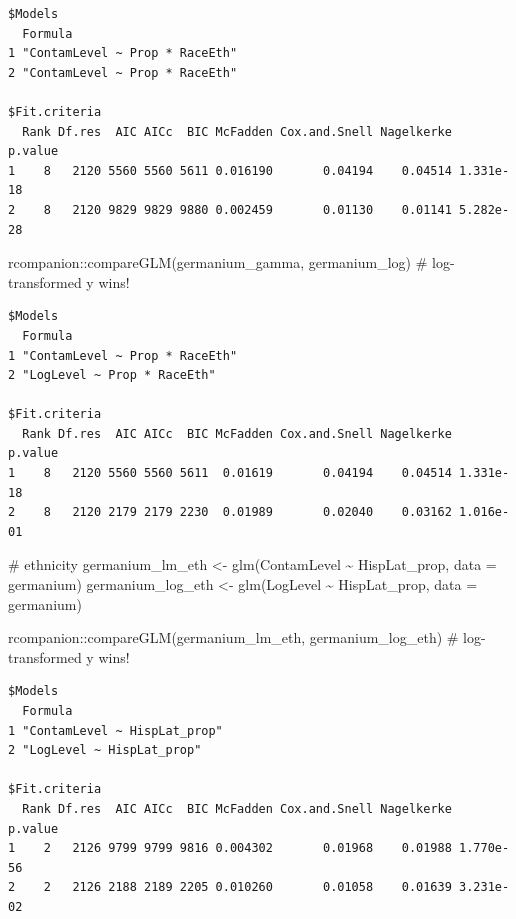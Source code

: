 \documentclass[
  letterpaper,
  DIV=11,
  numbers=noendperiod]{scrartcl}
\newenvironment{Shaded}{\begin{snugshade}}{\end{snugshade}}
\newcommand{\AttributeTok}[1]{\textcolor[rgb]{0.40,0.45,0.13}{#1}}
\newcommand{\CommentTok}[1]{\textcolor[rgb]{0.37,0.37,0.37}{#1}}
\newcommand{\FunctionTok}[1]{\textcolor[rgb]{0.28,0.35,0.67}{#1}}
\newcommand{\NormalTok}[1]{\textcolor[rgb]{0.00,0.23,0.31}{#1}}
\newcommand{\OtherTok}[1]{\textcolor[rgb]{0.00,0.23,0.31}{#1}}
\newcommand{\SpecialCharTok}[1]{\textcolor[rgb]{0.37,0.37,0.37}{#1}}
\begin{document}
\begin{verbatim}
$Models
  Formula                       
1 "ContamLevel ~ Prop * RaceEth"
2 "ContamLevel ~ Prop * RaceEth"

$Fit.criteria
  Rank Df.res  AIC AICc  BIC McFadden Cox.and.Snell Nagelkerke   p.value
1    8   2120 5560 5560 5611 0.016190       0.04194    0.04514 1.331e-18
2    8   2120 9829 9829 9880 0.002459       0.01130    0.01141 5.282e-28
\end{verbatim}

\begin{Shaded}
\begin{Highlighting}[]
\NormalTok{rcompanion}\SpecialCharTok{::}\FunctionTok{compareGLM}\NormalTok{(germanium\_gamma, germanium\_log) }\CommentTok{\# log{-}transformed y wins!}
\end{Highlighting}
\end{Shaded}

\begin{verbatim}
$Models
  Formula                       
1 "ContamLevel ~ Prop * RaceEth"
2 "LogLevel ~ Prop * RaceEth"   

$Fit.criteria
  Rank Df.res  AIC AICc  BIC McFadden Cox.and.Snell Nagelkerke   p.value
1    8   2120 5560 5560 5611  0.01619       0.04194    0.04514 1.331e-18
2    8   2120 2179 2179 2230  0.01989       0.02040    0.03162 1.016e-01
\end{verbatim}

\begin{Shaded}
\begin{Highlighting}[]
\CommentTok{\# ethnicity}
\NormalTok{germanium\_lm\_eth }\OtherTok{\textless{}{-}} \FunctionTok{glm}\NormalTok{(ContamLevel }\SpecialCharTok{\textasciitilde{}}\NormalTok{ HispLat\_prop, }\AttributeTok{data =}\NormalTok{ germanium)}
\NormalTok{germanium\_log\_eth }\OtherTok{\textless{}{-}} \FunctionTok{glm}\NormalTok{(LogLevel }\SpecialCharTok{\textasciitilde{}}\NormalTok{ HispLat\_prop, }\AttributeTok{data =}\NormalTok{ germanium)}

\NormalTok{rcompanion}\SpecialCharTok{::}\FunctionTok{compareGLM}\NormalTok{(germanium\_lm\_eth, germanium\_log\_eth) }\CommentTok{\# log{-}transformed y wins!}
\end{Highlighting}
\end{Shaded}

\begin{verbatim}
$Models
  Formula                     
1 "ContamLevel ~ HispLat_prop"
2 "LogLevel ~ HispLat_prop"   

$Fit.criteria
  Rank Df.res  AIC AICc  BIC McFadden Cox.and.Snell Nagelkerke   p.value
1    2   2126 9799 9799 9816 0.004302       0.01968    0.01988 1.770e-56
2    2   2126 2188 2189 2205 0.010260       0.01058    0.01639 3.231e-02
\end{verbatim}
\end{document}
